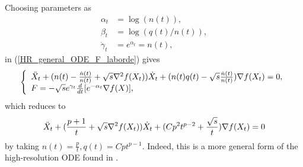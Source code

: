 \documentclass{article}
\theoremstyle{plain}
\theoremstyle{definition}
\theoremstyle{remark}
\begin{document}
Choosing parameters as
\begin{align}\label{prams_general}
        \alpha_t&=\log (n(t)),\nonumber\\
    \beta_t&=\log (q(t)/n(t)),\\
    \dot\gamma_t&=e^{\alpha_t}=n(t),\nonumber
\end{align}
in (\ref{HR_general_ODE_F_laborde}) gives
\begin{align}\label{HR_cnts_general_npq_laborde}
\left\{
\begin{array}{l}
     \Ddot{X}_t + (n(t)-\frac{\dot n(t)}{n(t)}+\sqrt{s}\nabla^2 f(X_t))\dot{X}_t+(n(t)q(t)-\sqrt{s} \frac{\dot n(t)}{n(t)})\nabla f(X_t)=0,   \\
    F = -\sqrt{s}e^{\gamma_t}\frac{d}{dt}[e^{-\alpha_t}\nabla f(X)],  
\end{array}\right.
\end{align}
which reduces to 
\begin{align}\label{HR_cnts_general_npq2}
     \Ddot{X}_t + (\frac{p+1}{t}+\sqrt{s}\nabla^2 f(X_t))\dot{X}_t+(Cp^2t^{p-2}+\frac{\sqrt{s}}{t})\nabla f(X_t)=0
\end{align}
by taking $n(t)=\frac{p}{t},q(t)=Cpt^{p-1}$. Indeed, this is a more general form of the high-resolution ODE found in \cite{pmlr-v108-laborde20a}.
\end{document}
